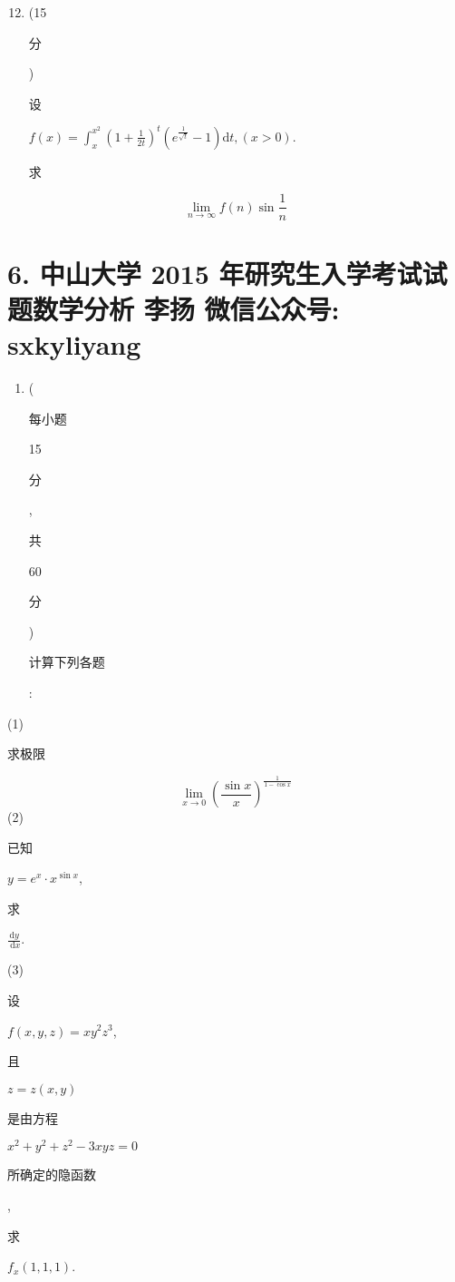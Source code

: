 \documentclass[10pt]{article}
\begin{document}
\begin{enumerate}
  \setcounter{enumi}{11}
  \item (15 \begin{CJK}{UTF8}{mj}分\end{CJK}) \begin{CJK}{UTF8}{mj}设\end{CJK} $f(x)=\int_{x}^{x^{2}}\left(1+\frac{1}{2 t}\right)^{t}\left(e^{\frac{1}{\sqrt{t}}}-1\right) \mathrm{d} t,(x>0)$. \begin{CJK}{UTF8}{mj}求\end{CJK}
\end{enumerate}
$$
\lim _{n \rightarrow \infty} f(n) \sin \frac{1}{n}
$$

\section{6. 中山大学 2015 年研究生入学考试试题数学分析 
 李扬 
 微信公众号: sxkyliyang}
\begin{enumerate}
  \item (\begin{CJK}{UTF8}{mj}每小题\end{CJK} 15 \begin{CJK}{UTF8}{mj}分\end{CJK}, \begin{CJK}{UTF8}{mj}共\end{CJK} 60 \begin{CJK}{UTF8}{mj}分\end{CJK}) \begin{CJK}{UTF8}{mj}计算下列各题\end{CJK}:
\end{enumerate}
(1) \begin{CJK}{UTF8}{mj}求极限\end{CJK}
$$
\lim _{x \rightarrow 0}\left(\frac{\sin x}{x}\right)^{\frac{1}{1-\cos x}}
$$
(2) \begin{CJK}{UTF8}{mj}已知\end{CJK} $y=e^{x} \cdot x^{\sin x}$, \begin{CJK}{UTF8}{mj}求\end{CJK} $\frac{\mathrm{d} y}{\mathrm{~d} x}$.

(3) \begin{CJK}{UTF8}{mj}设\end{CJK} $f(x, y, z)=x y^{2} z^{3}$, \begin{CJK}{UTF8}{mj}且\end{CJK} $z=z(x, y)$ \begin{CJK}{UTF8}{mj}是由方程\end{CJK} $x^{2}+y^{2}+z^{2}-3 x y z=0$ \begin{CJK}{UTF8}{mj}所确定的隐函数\end{CJK}, \begin{CJK}{UTF8}{mj}求\end{CJK} $f_{x}(1,1,1)$.
\end{document}
